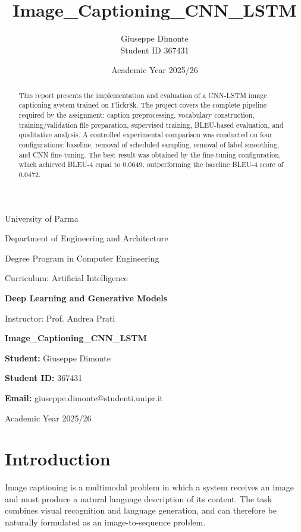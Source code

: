 \documentclass[11pt,a4paper]{article}
\title{Image\_Captioning\_CNN\_LSTM}
\author{Giuseppe Dimonte \\ Student ID 367431}
\date{Academic Year 2025/26}
\begin{document}
\begin{titlepage}
\centering
{\Large University of Parma \par}
\vspace{0.3cm}
{\large Department of Engineering and Architecture \par}
\vspace{0.3cm}
{\large Degree Program in Computer Engineering \par}
{\large Curriculum: Artificial Intelligence \par}
\vspace{1.2cm}
{\Large \textbf{Deep Learning and Generative Models} \par}
\vspace{0.5cm}
{\large Instructor: Prof. Andrea Prati \par}
\vspace{1.5cm}
{\huge \textbf{Image\_Captioning\_CNN\_LSTM} \par}
\vspace{1.5cm}
{\large \textbf{Student:} Giuseppe Dimonte \par}
{\large \textbf{Student ID:} 367431 \par}
{\large \textbf{Email:} giuseppe.dimonte@studenti.unipr.it \par}
\vfill
{\large Academic Year 2025/26 \par}
\end{titlepage}

\tableofcontents
\newpage

\begin{abstract}
This report presents the implementation and evaluation of a CNN-LSTM image captioning system trained on Flickr8k. The project covers the complete pipeline required by the assignment: caption preprocessing, vocabulary construction, training/validation file preparation, supervised training, BLEU-based evaluation, and qualitative analysis. A controlled experimental comparison was conducted on four configurations: baseline, removal of scheduled sampling, removal of label smoothing, and CNN fine-tuning. The best result was obtained by the fine-tuning configuration, which achieved BLEU-4 equal to 0.0649, outperforming the baseline BLEU-4 score of 0.0472.
\end{abstract}

\section{Introduction}

Image captioning is a multimodal problem in which a system receives an image and must produce a natural language description of its content. The task combines visual recognition and language generation, and can therefore be naturally formulated as an image-to-sequence problem.
\end{document}
